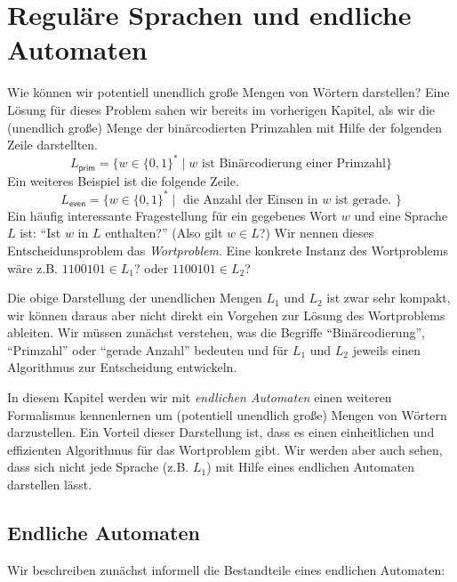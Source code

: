 \section[Reguläre Sprachen und endliche Automaten]{Reguläre Sprachen und endliche Automaten}
Wie können wir potentiell unendlich große Mengen von Wörtern darstellen?
Eine Lösung für dieses Problem sahen wir bereits im vorherigen Kapitel, als wir die (unendlich große) Menge der binärcodierten Primzahlen mit Hilfe der folgenden Zeile darstellten.
\[
L_\mathsf{prim}=\{w\in\{0,1\}^*\mid w \text{ ist Bin\"arcodierung einer Primzahl}\}
\]
Ein weiteres Beispiel ist die folgende Zeile.
\[
L_\mathsf{even}=\{w\in\{0,1\}^*\mid \text{ die Anzahl der Einsen in $w$ ist gerade. }\}
\]
Ein häufig interessante Fragestellung für ein gegebenes Wort $w$ und eine Sprache $L$ ist: ``Ist $w$ in $L$ enthalten?'' (Also gilt $w\in L$?)
Wir nennen dieses Entscheidunsproblem das \emph{Wortproblem}. Eine konkrete Instanz des Wortproblems wäre z.B. $1100101\in L_1$? oder $1100101\in L_2$?

Die obige Darstellung der unendlichen Mengen $L_1$ und $L_2$ ist zwar sehr kompakt, 
wir können daraus aber nicht direkt ein Vorgehen zur Lösung des Wortproblems ableiten.
Wir müssen zunächst verstehen, was die Begriffe ``Binärcodierung'', ``Primzahl'' oder ``gerade Anzahl'' bedeuten und für $L_1$ und $L_2$ jeweils einen Algorithmus zur Entscheidung entwickeln.

In diesem Kapitel werden wir mit \emph{endlichen Automaten} einen weiteren Formalismus kennenlernen um (potentiell unendlich große) Mengen von Wörtern darzustellen. 
Ein Vorteil dieser Darstellung ist, dass es einen einheitlichen und effizienten Algorithmus für das Wortproblem gibt.
Wir werden aber auch sehen, dass sich nicht jede Sprache (z.B. $L_1$) mit Hilfe eines endlichen Automaten darstellen lässt.

\subsection{Endliche Automaten}
Wir beschreiben zunächst informell die Bestandteile eines endlichen Automaten:

\newcommand{\qinit}{{q^\mathsf{init}}}
\newcommand{\hide}[1]{}

